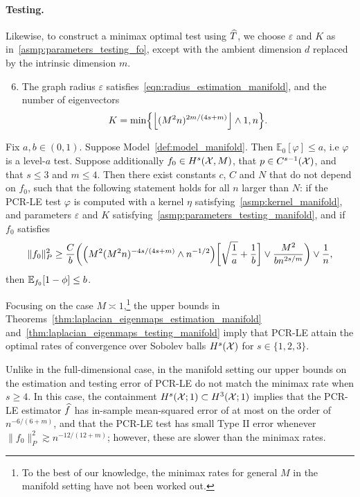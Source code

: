 \paragraph{Testing.}
Likewise, to construct a minimax optimal test using $\widehat{T}$, we choose $\varepsilon$ and $K$ as in~\ref{asmp:parameters_testing_fo}, except with the ambient dimension $d$ replaced by the intrinsic dimension $m$.
\begin{enumerate}[label=(P\arabic*)]
	\setcounter{enumi}{5}
	\item 
	\label{asmp:parameters_testing_manifold}
	The graph radius $\varepsilon$ satisfies~\eqref{eqn:radius_estimation_manifold}, and the number of eigenvectors
	\begin{equation*}
	K = \min\Bigl\{\left\lfloor (M^2n)^{2m/(4s + m)} \right\rfloor \wedge 1,n \Bigr\}.
	\end{equation*}
\end{enumerate}

\begin{theorem}
	\label{thm:laplacian_eigenmaps_testing_manifold}
	Fix $a,b \in (0,1)$. Suppose Model~\ref{def:model_manifold}. Then $\mathbb{E}_0[\varphi] \leq a$, i.e $\varphi$ is a level-$a$ test. Suppose additionally $f_0 \in H^s(\mathcal{X},M)$, that $p \in C^{s-1}(\mathcal{X})$, and that $s \leq 3$ and $m \leq 4$. Then there exist constants $c$, $C$ and $N$ that do not depend on $f_0$, such that the following statement holds for all $n$ larger than $N$: if the PCR-LE test $\varphi$ is computed with a kernel $\eta$ satisfying~\ref{asmp:kernel_manifold}, and parameters $\varepsilon$ and $K$ satisfying~\ref{asmp:parameters_testing_manifold}, and if $f_0$ satisfies
	\begin{equation}
	\label{eqn:laplacian_eigenmaps_testing_criticalradius_manifold}
	\|f_0\|_P^2 \geq \frac{C}{b}\biggl(\Bigl(M^2(M^2n)^{-4s/(4s + m) } \wedge n^{-1/2}\Bigr)\biggl[\sqrt{\frac{1}{a}} + \frac{1}{b}\biggr] \vee \frac{M^2}{b n^{2s/m}} \biggr) \vee \frac{1}{n},
	\end{equation}
	then $\mathbb{E}_{f_0}[1 - \phi] \leq b$.
\end{theorem}
Focusing on the case $M \asymp 1$,\footnote{To the best of our knowledge, the minimax rates for general $M$ in the manifold setting have not been worked out.} the upper bounds in Theorems~\ref{thm:laplacian_eigenmaps_estimation_manifold} and~\ref{thm:laplacian_eigenmaps_testing_manifold} imply that PCR-LE attain the optimal rates of convergence over Sobolev balls $H^s(\mathcal{X})$ for $s \in \{1,2,3\}$. 

Unlike in the full-dimensional case, in the manifold setting our upper bounds on the estimation and testing error of PCR-LE do not match the minimax rate when $s \geq 4$.  In this case, the containment $H^s(\mathcal{X};1) \subset H^{3}(\mathcal{X};1)$ implies that the PCR-LE estimator $\widehat{f}$ has in-sample mean-squared error of at most on the order of $n^{-6/(6 + m)}$, and that the PCR-LE test has small Type II error whenever $\|f_0\|_P^2 \gtrsim n^{-12/(12 + m)}$; however, these are slower than the minimax rates. 

